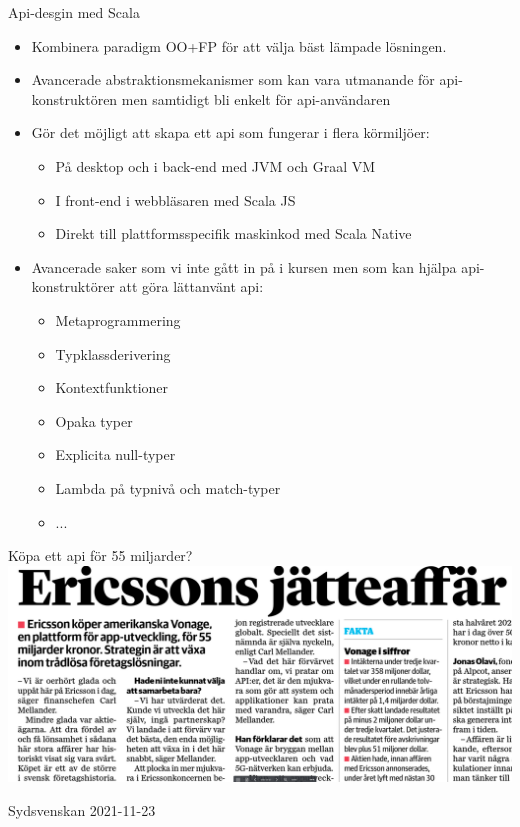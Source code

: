\begin{Slide}{Api-desgin med Scala}
\begin{itemize}\SlideFontSmall
\item Kombinera paradigm OO+FP för att välja bäst lämpade lösningen.
\item Avancerade abstraktionsmekanismer som kan vara utmanande för api-konstruktören men samtidigt bli enkelt för api-användaren
\item Gör det möjligt att skapa ett api som fungerar i flera körmiljöer:
   \begin{itemize}\SlideFontTiny
   \item På desktop och i back-end med JVM och Graal VM
   \item I front-end i webbläsaren med Scala JS
   \item Direkt till plattformsspecifik maskinkod med Scala Native
   \end{itemize}
\item Avancerade saker som vi inte gått in på i kursen men som kan hjälpa api-konstruktörer att göra lättanvänt api:
   \begin{itemize}\SlideFontTiny
   \item Metaprogrammering
   \item Typklassderivering
   \item Kontextfunktioner
   \item Opaka typer
   \item Explicita null-typer
   \item Lambda på typnivå och match-typer
   \item ...
\end{itemize}
\end{itemize}
\end{Slide}

\ifkompendium\else
\begin{Slide}{Köpa ett api för 55 miljarder?}
\hspace*{-0.7cm}\includegraphics[width=1.1\textwidth]{../img/ericsson-buy-api.png}

{ \vspace{2em} Sydsvenskan 2021-11-23 }
\end{Slide}
\fi




